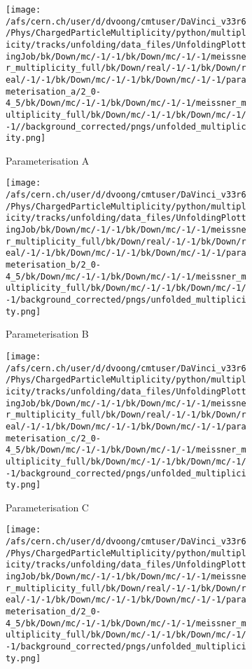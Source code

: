 \begin{figure}[h]
	\begin{subfigure}{0.49\textwidth}
		\texttt{[image: /afs/cern.ch/user/d/dvoong/cmtuser/DaVinci\_v33r6/Phys/ChargedParticleMultiplicity/python/multiplicity/tracks/unfolding/data\_files/UnfoldingPlottingJob/bk/Down/mc/-1/-1/bk/Down/mc/-1/-1/meissner\_multiplicity\_full/bk/Down/real/-1/-1/bk/Down/real/-1/-1/bk/Down/mc/-1/-1/bk/Down/mc/-1/-1/parameterisation\_a/2\_0-4\_5/bk/Down/mc/-1/-1/bk/Down/mc/-1/-1/meissner\_multiplicity\_full/bk/Down/mc/-1/-1/bk/Down/mc/-1/-1//background\_corrected/pngs/unfolded\_multiplicity.png]}
		\caption{Parameterisation A}
	\end{subfigure}
	\begin{subfigure}{0.49\textwidth}
		\texttt{[image: /afs/cern.ch/user/d/dvoong/cmtuser/DaVinci\_v33r6/Phys/ChargedParticleMultiplicity/python/multiplicity/tracks/unfolding/data\_files/UnfoldingPlottingJob/bk/Down/mc/-1/-1/bk/Down/mc/-1/-1/meissner\_multiplicity\_full/bk/Down/real/-1/-1/bk/Down/real/-1/-1/bk/Down/mc/-1/-1/bk/Down/mc/-1/-1/parameterisation\_b/2\_0-4\_5/bk/Down/mc/-1/-1/bk/Down/mc/-1/-1/meissner\_multiplicity\_full/bk/Down/mc/-1/-1/bk/Down/mc/-1/-1/background\_corrected/pngs/unfolded\_multiplicity.png]}
		\caption{Parameterisation B}
	\end{subfigure}
	\begin{subfigure}{0.49\textwidth}
		\texttt{[image: /afs/cern.ch/user/d/dvoong/cmtuser/DaVinci\_v33r6/Phys/ChargedParticleMultiplicity/python/multiplicity/tracks/unfolding/data\_files/UnfoldingPlottingJob/bk/Down/mc/-1/-1/bk/Down/mc/-1/-1/meissner\_multiplicity\_full/bk/Down/real/-1/-1/bk/Down/real/-1/-1/bk/Down/mc/-1/-1/bk/Down/mc/-1/-1/parameterisation\_c/2\_0-4\_5/bk/Down/mc/-1/-1/bk/Down/mc/-1/-1/meissner\_multiplicity\_full/bk/Down/mc/-1/-1/bk/Down/mc/-1/-1/background\_corrected/pngs/unfolded\_multiplicity.png]}
		\caption{Parameterisation C}
	\end{subfigure}
	\begin{subfigure}{0.49\textwidth}
		\texttt{[image: /afs/cern.ch/user/d/dvoong/cmtuser/DaVinci\_v33r6/Phys/ChargedParticleMultiplicity/python/multiplicity/tracks/unfolding/data\_files/UnfoldingPlottingJob/bk/Down/mc/-1/-1/bk/Down/mc/-1/-1/meissner\_multiplicity\_full/bk/Down/real/-1/-1/bk/Down/real/-1/-1/bk/Down/mc/-1/-1/bk/Down/mc/-1/-1/parameterisation\_d/2\_0-4\_5/bk/Down/mc/-1/-1/bk/Down/mc/-1/-1/meissner\_multiplicity\_full/bk/Down/mc/-1/-1/bk/Down/mc/-1/-1/background\_corrected/pngs/unfolded\_multiplicity.png]}

\end{subfigure}
\end{figure}
